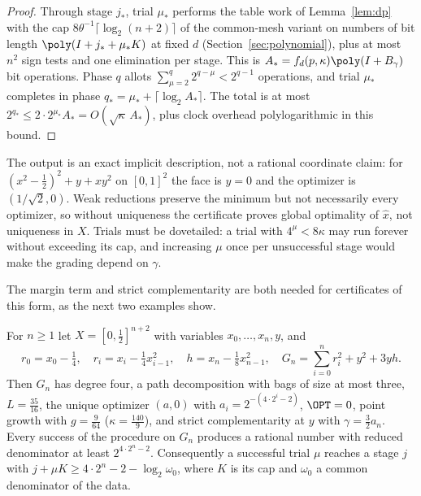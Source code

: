 \begin{proof}
Through stage $j_*$, trial $\mu_*$ performs the table work of
Lemma~\ref{lem:dp} with the cap $8\theta^{-1}\lceil\log_2(n+2)\rceil$ of the common-mesh variant on numbers of bit length
$\poly(I+j_*+\mu_*K)$ at fixed $d$ (Section~\ref{sec:polynomial}), plus at most
$n^2$ sign tests and one elimination per stage. This is
$A_*=f_d(p,\kappa)\poly(I+B_\gamma)$ bit operations. Phase $q$ allots
$\sum_{\mu=2}^q2^{q-\mu}<2^{q-1}$ operations, and trial $\mu_*$ completes in
phase $q_*=\mu_*+\lceil\log_2A_*\rceil$. The total is at most
$2^{q_*}\le2\cdot2^{\mu_*}A_*=O(\sqrt\kappa\,A_*)$, plus clock overhead
polylogarithmic in this bound.
\end{proof}

The output is an exact implicit description, not a rational coordinate claim:
for $(x^2-\frac12)^2+y+xy^2$ on $[0,1]^2$ the face is $y=0$ and the optimizer
is $(1/\sqrt2,0)$. Weak reductions preserve the minimum but not necessarily
every optimizer, so without uniqueness the certificate proves global
optimality of $\hat x$, not uniqueness in $X$. Trials must be dovetailed: a
trial with $4^\mu<8\kappa$ may run forever without exceeding its cap, and
increasing $\mu$ once per unsuccessful stage would make the grading depend on
$\gamma$.

The margin term and strict complementarity are both needed for certificates
of this form, as the next two examples show.

\begin{proposition}\label{prop:margin}
For $n\ge1$ let $X=[0,\frac12]^{n+2}$ with variables $x_0,\ldots,x_n,y$, and
\[
r_0=x_0-\tfrac14,\quad r_i=x_i-\tfrac14x_{i-1}^2,\quad
h=x_n-\tfrac18x_{n-1}^2,\quad
G_n=\sum_{i=0}^nr_i^2+y^2+3yh.
\]
Then $G_n$ has degree four, a path decomposition with bags of size at most
three, $L=\frac{35}{16}$, the unique optimizer $(a,0)$ with
$a_i=2^{-(4\cdot2^i-2)}$, $\OPT=0$, point growth with $g=\frac9{64}$
($\kappa=\frac{140}9$), and strict complementarity at $y$ with
$\gamma=\frac32a_n$. Every success of the procedure on $G_n$ produces a
rational number with reduced denominator at least $2^{4\cdot2^n-2}$.
Consequently a successful trial $\mu$ reaches a stage $j$ with
$j+\mu K\ge4\cdot2^n-2-\log_2\omega_0$, where $K$ is its cap and $\omega_0$ a
common denominator of the data.
\end{proposition}

